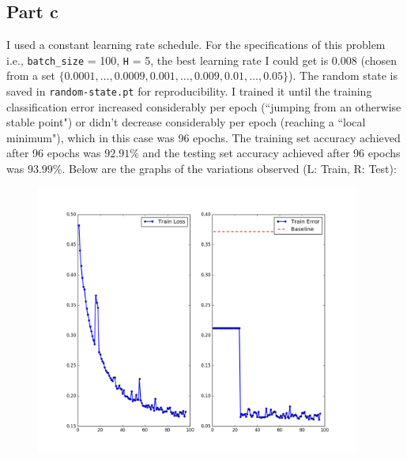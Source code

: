 \documentclass{article}
\begin{document}
\subsection*{Part c}
\begin{flushleft}
I used a constant learning rate schedule. For the specifications of this problem i.e., \texttt{batch\_size} = 100, \texttt{H} = 5, the best learning rate I could get is 0.008 (chosen from a set \(\{0.0001, \ldots, 0.0009, 0.001, \ldots, 0.009, 0.01, \ldots, 0.05 \}\)). The random state is saved in \texttt{random-state.pt} for reproducibility. I trained it until the training classification error increased considerably per epoch (``jumping from an otherwise stable point") or didn't decrease considerably per epoch (reaching a ``local minimum"), which in this case was 96 epochs. The training set accuracy achieved after 96 epochs was \(92.91\%\) and the testing set accuracy achieved after 96 epochs was \(93.99\%\). Below are the graphs of the variations observed (L: Train, R: Test):
\begin{figure}[H]
\begin{minipage}{0.49\linewidth}
\centering
\includegraphics[width=0.95\textwidth]{Train-Statistics-sgd-batchsize=100-bce.png}
\end{minipage}
\hfill
\begin{minipage}{0.49\linewidth}
\centering

\end{minipage}
\end{figure}
\end{flushleft}
\end{document}
